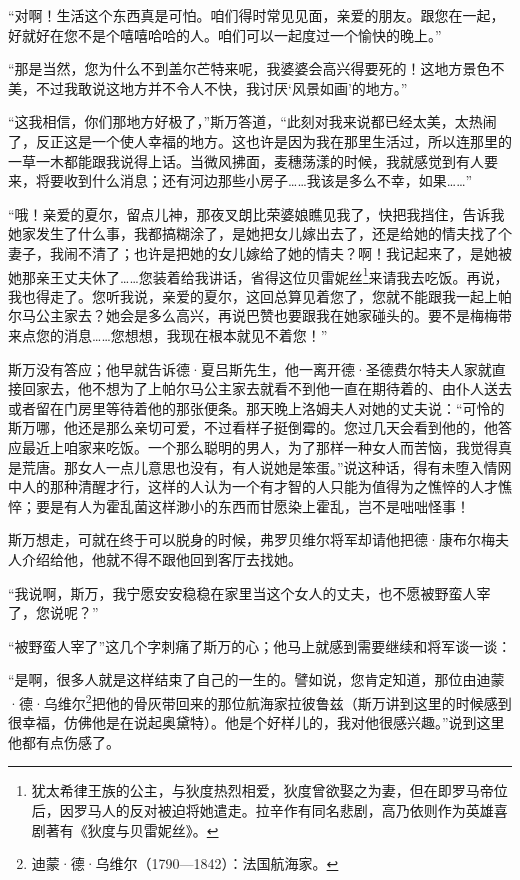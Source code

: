 \par “对啊！生活这个东西真是可怕。咱们得时常见见面，亲爱的朋友。跟您在一起，好就好在您不是个嘻嘻哈哈的人。咱们可以一起度过一个愉快的晚上。”
\par “那是当然，您为什么不到盖尔芒特来呢，我婆婆会高兴得要死的！这地方景色不美，不过我敢说这地方并不令人不快，我讨厌‘风景如画’的地方。”
\par “这我相信，你们那地方好极了，”斯万答道，“此刻对我来说都已经太美，太热闹了，反正这是一个使人幸福的地方。这也许是因为我在那里生活过，所以连那里的一草一木都能跟我说得上话。当微风拂面，麦穗荡漾的时候，我就感觉到有人要来，将要收到什么消息；还有河边那些小房子……我该是多么不幸，如果……”
\par “哦！亲爱的夏尔，留点儿神，那夜叉朗比荣婆娘瞧见我了，快把我挡住，告诉我她家发生了什么事，我都搞糊涂了，是她把女儿嫁出去了，还是给她的情夫找了个妻子，我闹不清了；也许是把她的女儿嫁给了她的情夫？啊！我记起来了，是她被她那亲王丈夫休了……您装着给我讲话，省得这位贝雷妮丝\footnote{犹太希律王族的公主，与狄度热烈相爱，狄度曾欲娶之为妻，但在即罗马帝位后，因罗马人的反对被迫将她遣走。拉辛作有同名悲剧，高乃依则作为英雄喜剧著有《狄度与贝雷妮丝》。}来请我去吃饭。再说，我也得走了。您听我说，亲爱的夏尔，这回总算见着您了，您就不能跟我一起上帕尔马公主家去？她会是多么高兴，再说巴赞也要跟我在她家碰头的。要不是梅梅带来点您的消息……您想想，我现在根本就见不着您！”
\par 斯万没有答应；他早就告诉德·夏吕斯先生，他一离开德·圣德费尔特夫人家就直接回家去，他不想为了上帕尔马公主家去就看不到他一直在期待着的、由仆人送去或者留在门房里等待着他的那张便条。那天晚上洛姆夫人对她的丈夫说：“可怜的斯万哪，他还是那么亲切可爱，不过看样子挺倒霉的。您过几天会看到他的，他答应最近上咱家来吃饭。一个那么聪明的男人，为了那样一种女人而苦恼，我觉得真是荒唐。那女人一点儿意思也没有，有人说她是笨蛋。”说这种话，得有未堕入情网中人的那种清醒才行，这样的人认为一个有才智的人只能为值得为之憔悴的人才憔悴；要是有人为霍乱菌这样渺小的东西而甘愿染上霍乱，岂不是咄咄怪事！
\par 斯万想走，可就在终于可以脱身的时候，弗罗贝维尔将军却请他把德·康布尔梅夫人介绍给他，他就不得不跟他回到客厅去找她。
\par “我说啊，斯万，我宁愿安安稳稳在家里当这个女人的丈夫，也不愿被野蛮人宰了，您说呢？”
\par “被野蛮人宰了”这几个字刺痛了斯万的心；他马上就感到需要继续和将军谈一谈：
\par “是啊，很多人就是这样结束了自己的一生的。譬如说，您肯定知道，那位由迪蒙·德·乌维尔\footnote{迪蒙·德·乌维尔（1790—1842）：法国航海家。}把他的骨灰带回来的那位航海家拉彼鲁兹（斯万讲到这里的时候感到很幸福，仿佛他是在说起奥黛特）。他是个好样儿的，我对他很感兴趣。”说到这里他都有点伤感了。
